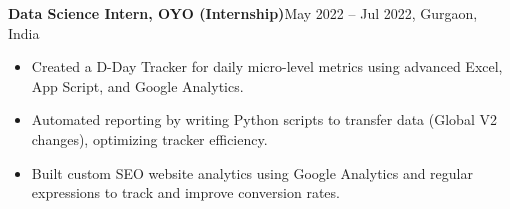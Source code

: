 \textbf{Data Science Intern, OYO (Internship)}\hfill May 2022 -- Jul 2022, Gurgaon, India
\begin{itemize}
    \item Created a D-Day Tracker for daily micro-level metrics using advanced Excel, App Script, and Google Analytics.
    \item Automated reporting by writing Python scripts to transfer data (Global V2 changes), optimizing tracker efficiency.
    \item Built custom SEO website analytics using Google Analytics and regular expressions to track and improve conversion rates.
\end{itemize}
